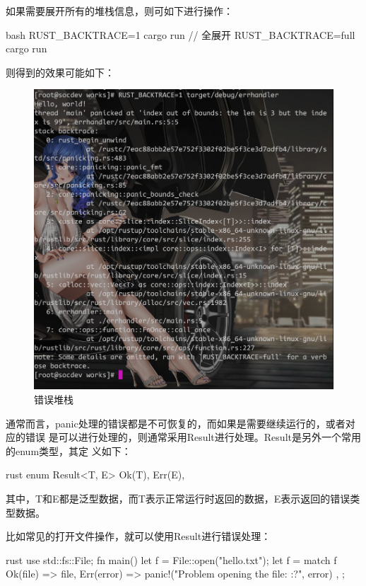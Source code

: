 如果需要展开所有的堆栈信息，则可如下进行操作：
\begin{code-block}{bash}
RUST_BACKTRACE=1 cargo run
// 全展开
RUST_BACKTRACE=full cargo run
\end{code-block}
则得到的效果可能如下：
\begin{figure}[H]
  \centering
  \includegraphics[width=\linewidth]{rust_err_panic_trace.png}
  \caption{错误堆栈}
  \label{fig:rust_err_panic_trace}
\end{figure}

通常而言，panic处理的错误都是不可恢复的，而如果是需要继续运行的，或者对应的错误
是可以进行处理的，则通常采用Result进行处理。Result是另外一个常用的enum类型，其定
义如下：
\begin{code-block}{rust}
enum Result<T, E> {
    Ok(T),
    Err(E),
}
\end{code-block}
其中，T和E都是泛型数据，而T表示正常运行时返回的数据，E表示返回的错误类型数据。

比如常见的打开文件操作，就可以使用Result进行错误处理：
\begin{code-block}{rust}
use std::fs::File;
fn main() {
    let f = File::open("hello.txt");
    let f = match f {
        Ok(file) => file,
        Err(error) => {
            panic!("Problem opening the file: {:?}", error)
        },
    };
}
\end{code-block}

